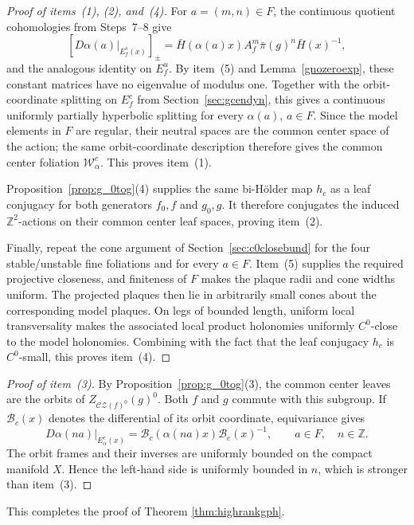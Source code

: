 \documentclass[11pt]{amsart}
\numberwithin{equation}{section}
\newcommand{\CZ}{\mathcal{CZ}}
\theoremstyle{plain}
\begin{document}
\begin{proof}[Proof of items~(1), (2), and~(4)]
For $a=(m,n)\in F$, the continuous quotient cohomologies from
Steps~7--8 give
\[
[D\alpha(a)|_{E_f^s(x)}]_\pm
 =\bar H(\alpha(a)x)A_f^m\bar\pi(g)^n\bar H(x)^{-1},
\]
and the analogous identity on $E_f^u$.  By item~(5) and
Lemma~\ref{gnozeroexp}, these constant matrices have no eigenvalue of
modulus one.  Together with the orbit-coordinate splitting on $E_f^c$
from Section~\ref{sec:gcendyn}, this gives a continuous uniformly
partially hyperbolic splitting for every $\alpha(a)$, $a\in F$.  Since
the model elements in $F$ are regular, their neutral spaces are the
common center space of the action; the same orbit-coordinate description
therefore gives the common center foliation $\mathcal W^c_\alpha$.
This proves item~(1).

Proposition~\ref{prop:g_0tog}(4) supplies the same bi-H\"older map $h_c$
as a leaf conjugacy for both generators $f_0,f$ and $g_0,g$.  It
therefore conjugates the induced $\mathbb Z^2$-actions on their common
center leaf spaces, proving item~(2).

Finally, repeat the cone argument of Section~\ref{sec:c0closebund} for
the four stable/unstable fine foliations and for every $a\in F$.  Item~(5)
supplies the required projective closeness, and finiteness of $F$ makes
the plaque radii and cone widths uniform.  The projected plaques then lie
in arbitrarily small cones about the corresponding model plaques. On
legs of bounded length, uniform local transversality makes the associated
local product holonomies uniformly $C^0$-close to the model holonomies.
Combining with the fact that the leaf conjugacy $h_c$ is $C^0$-small, this proves
item~(4).
\end{proof}

\begin{proof}[Proof of item~(3)]
By Proposition~\ref{prop:g_0tog}(3), the common center leaves are the
orbits of $Z_{\CZ(f)^0}(g)^0$.  Both $f$ and $g$ commute with this
subgroup.  If $\mathcal B_c(x)$ denotes the differential of its orbit
coordinate, equivariance gives
\[
D\alpha(na)|_{E^c_\alpha(x)}
 =\mathcal B_c(\alpha(na)x)\mathcal B_c(x)^{-1},
 \qquad a\in F,\quad n\in\mathbb Z.
\]
The orbit frames and their inverses are uniformly bounded on the compact
manifold $X$.  Hence the left-hand side is uniformly bounded in $n$,
which is stronger than item~(3).
\end{proof}

This completes the proof of Theorem \ref{thm:highrankgph}.
\end{document}
